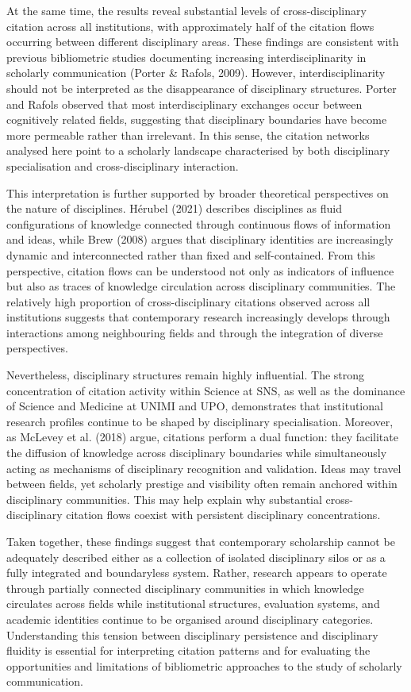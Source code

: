 \documentclass[year=2026]{cup-journal}
\begin{document}
At the same time, the results reveal substantial levels of cross-disciplinary citation across all institutions, with approximately half of the citation flows occurring between different disciplinary areas. These findings are consistent with previous bibliometric studies documenting increasing interdisciplinarity in scholarly communication (Porter \& Rafols, 2009). However, interdisciplinarity should not be interpreted as the disappearance of disciplinary structures. Porter and Rafols observed that most interdisciplinary exchanges occur between cognitively related fields, suggesting that disciplinary boundaries have become more permeable rather than irrelevant. In this sense, the citation networks analysed here point to a scholarly landscape characterised by both disciplinary specialisation and cross-disciplinary interaction.

This interpretation is further supported by broader theoretical perspectives on the nature of disciplines. Hérubel (2021) describes disciplines as fluid configurations of knowledge connected through continuous flows of information and ideas, while Brew (2008) argues that disciplinary identities are increasingly dynamic and interconnected rather than fixed and self-contained. From this perspective, citation flows can be understood not only as indicators of influence but also as traces of knowledge circulation across disciplinary communities. The relatively high proportion of cross-disciplinary citations observed across all institutions suggests that contemporary research increasingly develops through interactions among neighbouring fields and through the integration of diverse perspectives.

Nevertheless, disciplinary structures remain highly influential. The strong concentration of citation activity within Science at SNS, as well as the dominance of Science and Medicine at UNIMI and UPO, demonstrates that institutional research profiles continue to be shaped by disciplinary specialisation. Moreover, as McLevey et al. (2018) argue, citations perform a dual function: they facilitate the diffusion of knowledge across disciplinary boundaries while simultaneously acting as mechanisms of disciplinary recognition and validation. Ideas may travel between fields, yet scholarly prestige and visibility often remain anchored within disciplinary communities. This may help explain why substantial cross-disciplinary citation flows coexist with persistent disciplinary concentrations.

Taken together, these findings suggest that contemporary scholarship cannot be adequately described either as a collection of isolated disciplinary silos or as a fully integrated and boundaryless system. Rather, research appears to operate through partially connected disciplinary communities in which knowledge circulates across fields while institutional structures, evaluation systems, and academic identities continue to be organised around disciplinary categories. Understanding this tension between disciplinary persistence and disciplinary fluidity is essential for interpreting citation patterns and for evaluating the opportunities and limitations of bibliometric approaches to the study of scholarly communication.
\end{document}
